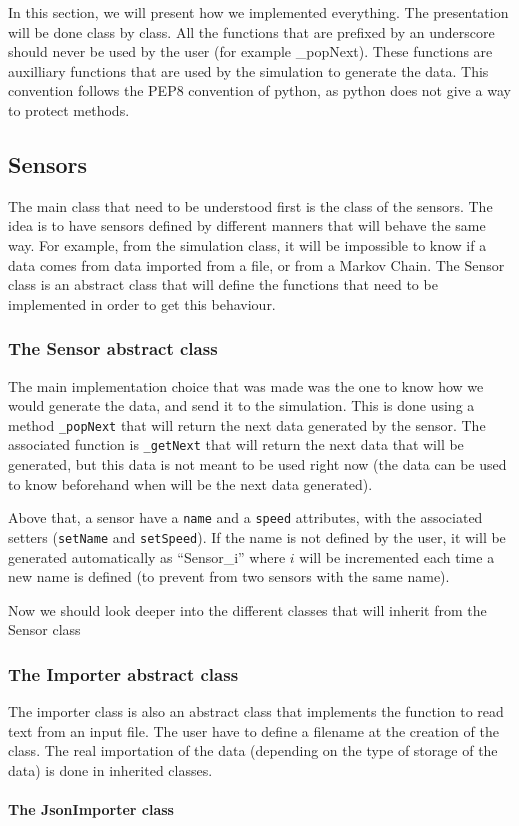 
In this section, we will present how we implemented everything. The presentation will be done class by class. All the functions that are prefixed by an underscore should never be used by the user (for example \_popNext). These functions are auxilliary functions that are used by the simulation to generate the data. This convention follows the PEP8 convention of python, as python does not give a way to protect methods.

\subsection{Sensors}

The main class that need to be understood first is the class of the sensors. The idea is to have sensors defined by different manners that will behave the same way. For example, from the simulation class, it will be impossible to know if a data comes from data imported from a file, or from a Markov Chain. The Sensor class is an abstract class that will define the functions that need to be implemented in order to get this behaviour.

\subsubsection{The Sensor abstract class}

The main implementation choice that was made was the one to know how we would generate the data, and send it to the simulation. This is done using a method \verb!_popNext! that will return the next data generated by the sensor. The associated function is \verb!_getNext! that will return the next data that will be generated, but this data is not meant to be used right now (the data can be used to know beforehand when will be the next data generated).

Above that, a sensor have a \verb!name! and a \verb!speed! attributes, with the associated setters (\verb!setName! and \verb!setSpeed!). If the name is not defined by the user, it will be generated automatically as ``Sensor\_i'' where $i$ will be incremented each time a new name is defined (to prevent from two sensors with the same name).

Now we should look deeper into the different classes that will inherit from the Sensor class

\subsubsection{The Importer abstract class}

The importer class is also an abstract class that implements the function to read text from an input file. The user have to define a filename at the creation of the class. The real importation of the data (depending on the type of storage of the data) is done in inherited classes.

\paragraph{The JsonImporter class}


